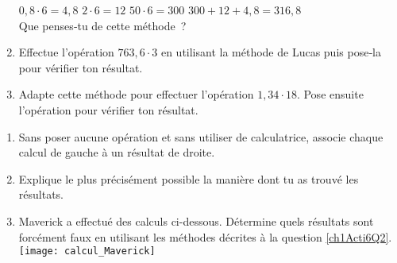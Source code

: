 \begin{activite}
\begin{partie}
\begin{enumerate}
 $0,8 \cdot 6 = 4,8$ \hfill $2 \cdot 6 = 12$ \hfill $50 \cdot 6 = 300$ \hfill $300 + 12 + 4,8 = 316,8$ \\[-1em]
 
 Que penses‑tu de cette méthode ?
 \item Effectue l'opération $763,6 \cdot 3$ en utilisant la méthode de Lucas puis pose‑la pour vérifier ton résultat.
 \item Adapte cette méthode pour effectuer l'opération $1,34 \cdot 18$. Pose ensuite l'opération pour vérifier ton résultat.
 \end{enumerate}
\end{partie}

\end{activite}





\begin{activite}

\begin{enumerate}
 \item Sans poser aucune opération et sans utiliser de calculatrice, associe chaque calcul de gauche à un résultat de droite. 
 \item Explique le plus précisément possible la manière dont tu as trouvé les résultats.\label{ch1Acti6Q2}
 \item Maverick a effectué des calculs ci-dessous. Détermine quels résultats sont forcément faux en utilisant les méthodes décrites à la question \ref{ch1Acti6Q2}.\\[1em]
\texttt{[image: calcul\_Maverick]}

 \end{enumerate}
 
 \end{activite}




